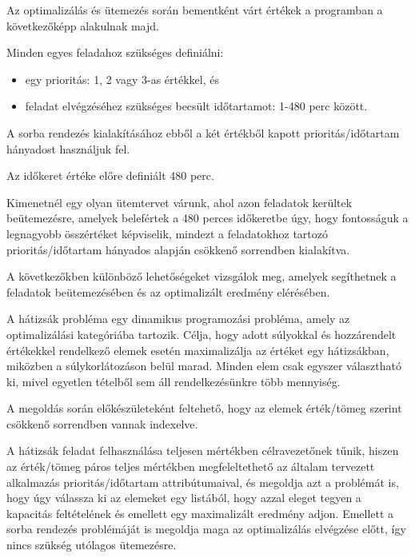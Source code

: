 Az optimalizálás és ütemezés során bementként várt értékek a programban a következőképp alakulnak majd.

Minden egyes feladahoz szükséges definiálni:

\begin{itemize}
	
\item egy prioritás: 1, 2 vagy 3-as értékkel, és
\item feladat elvégzéséhez szükséges becsült időtartamot: 1-480 perc között.

\end{itemize}

A sorba rendezés kialakításához ebből a két értékből kapott prioritás/időtartam hányadost használjuk fel.

Az időkeret értéke előre definiált 480 perc.

Kimenetnél egy olyan ütemtervet várunk, ahol azon feladatok kerültek beütemezésre, amelyek belefértek a 480 perces időkeretbe úgy, hogy fontosságuk a legnagyobb összértéket képviselik, mindezt a feladatokhoz tartozó prioritás/időtartam hányados alapján csökkenő sorrendben kialakítva.

A következőkben különböző lehetőségeket vizsgálok meg, amelyek segíthetnek a feladatok beütemezésében és az optimalizált eredmény elérésében.



A hátizsák probléma egy dinamikus programozási probléma, amely az optimalizálási kategóriába tartozik. Célja, hogy adott súlyokkal és hozzárendelt értékekkel rendelkező elemek esetén maximalizálja az értéket egy hátizsákban, miközben a súlykorlátozáson belül marad. Minden elem csak egyszer választható ki, mivel egyetlen tételből sem áll rendelkezésünkre több mennyiség.\cite{knapsack}

A megoldás során előkészületeként feltehető, hogy az elemek érték/tömeg szerint csökkenő sorrendben vannak indexelve.

A hátizsák feladat felhasználása teljesen mértékben célravezetőnek tűnik, hiszen az érték/tömeg páros teljes mértékben megfeleltethető az általam tervezett alkalmazás prioritás/időtartam attribútumaival, és megoldja azt a problémát is, hogy úgy válassza ki az elemeket egy listából, hogy azzal eleget tegyen a kapacitás feltételének és emellett egy maximalizált eredmény adjon. Emellett a sorba rendezés problémáját is megoldja maga az optimalizálás elvégzése előtt, így nincs szükség utólagos ütemezésre.

